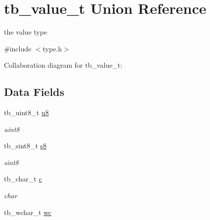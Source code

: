 \hypertarget{uniontb__value__t}{\section{tb\-\_\-value\-\_\-t Union Reference}
\label{uniontb__value__t}
}


the value type  




{\ttfamily \#include $<$type.\-h$>$}



Collaboration diagram for tb\-\_\-value\-\_\-t\-:
\subsection*{Data Fields}
\begin{DoxyCompactItemize}
\item 
\hypertarget{uniontb__value__t_abf9e3eb60b720035e0bf4f703bf642de}{tb\-\_\-uint8\-\_\-t \hyperlink{uniontb__value__t_abf9e3eb60b720035e0bf4f703bf642de}{u8}}\label{uniontb__value__t_abf9e3eb60b720035e0bf4f703bf642de}

\begin{DoxyCompactList}\small\item\em uint8 \end{DoxyCompactList}\item 
\hypertarget{uniontb__value__t_a201d4e699144305f2da5d300e4a404bd}{tb\-\_\-sint8\-\_\-t \hyperlink{uniontb__value__t_a201d4e699144305f2da5d300e4a404bd}{s8}}\label{uniontb__value__t_a201d4e699144305f2da5d300e4a404bd}

\begin{DoxyCompactList}\small\item\em sint8 \end{DoxyCompactList}\item 
\hypertarget{uniontb__value__t_a36d1922cce8b6724294d02d013ce5fd9}{tb\-\_\-char\-\_\-t \hyperlink{uniontb__value__t_a36d1922cce8b6724294d02d013ce5fd9}{c}}\label{uniontb__value__t_a36d1922cce8b6724294d02d013ce5fd9}

\begin{DoxyCompactList}\small\item\em char \end{DoxyCompactList}\item 
\hypertarget{uniontb__value__t_a7ae1b848a5225cec07b0a582d1bf6a7e}{tb\-\_\-wchar\-\_\-t \hyperlink{uniontb__value__t_a7ae1b848a5225cec07b0a582d1bf6a7e}{wc}}\label{uniontb__value__t_a7ae1b848a5225cec07b0a582d1bf6a7e}


\end{DoxyCompactItemize}
